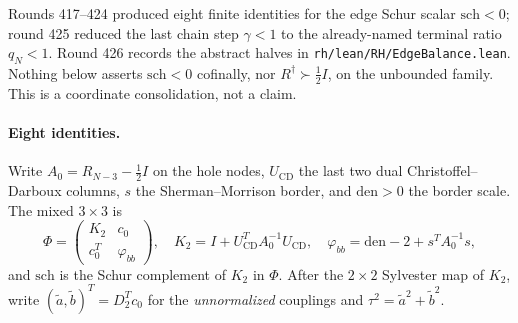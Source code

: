 \documentclass[11pt]{article}
\theoremstyle{remark}
\newcommand{\Rd}{R^{\dagger}}
\newcommand{\half}{\tfrac12}
\begin{document}
Rounds 417--424 produced eight finite identities for the edge Schur
scalar $\mathrm{sch}<0$; round 425 reduced the last chain step
$\gamma<1$ to the already-named terminal ratio $q_N<1$.  Round 426
records the abstract halves in
\texttt{rh/lean/RH/EdgeBalance.lean}.  Nothing below asserts
$\mathrm{sch}<0$ cofinally, nor $\Rd\succ\half I$, on the unbounded
family.  This is a coordinate consolidation, not a claim.

\paragraph{Eight identities.}
Write $A_0=R_{N-3}-\half I$ on the hole nodes, $U_{\mathrm{CD}}$ the
last two dual Christoffel--Darboux columns, $s$ the Sherman--Morrison
border, and $\mathrm{den}>0$ the border scale.  The mixed
$3\times 3$ is
\[
\Phi
=\begin{pmatrix} K_2 & c_0\\ c_0^T & \varphi_{bb}\end{pmatrix},
\quad
K_2=I+U_{\mathrm{CD}}^TA_0^{-1}U_{\mathrm{CD}},
\quad
\varphi_{bb}=\mathrm{den}-2+s^TA_0^{-1}s,
\]
and $\mathrm{sch}$ is the Schur complement of $K_2$ in $\Phi$.
After the $2\times 2$ Sylvester map of $K_2$, write
$(\tilde a,\tilde b)^T=D_2^Tc_0$ for the \emph{unnormalized}
couplings and $\tau^2=\tilde a^2+\tilde b^2$.
\end{document}
